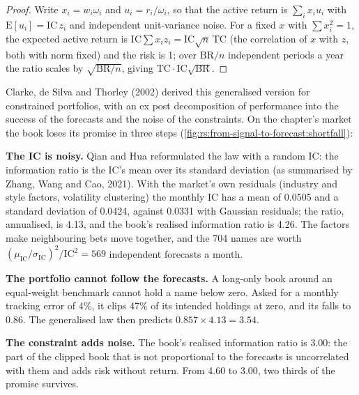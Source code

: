 \begin{proof}
Write $x_i = w_i\omega_i$ and $u_i = r_i/\omega_i$, so that the active return is $\sum_i x_iu_i$ with $\mathrm{E}[u_i] = \mathrm{IC}\,z_i$ and independent
unit-variance noise. For a fixed $x$ with $\sum x_i^2 = 1$, the expected active return is $\mathrm{IC}\sum x_iz_i = \mathrm{IC}\sqrt n\,\mathrm{TC}$ (the
correlation of $x$ with $z$, both with norm fixed) and the risk is 1; over $\mathrm{BR}/n$ independent periods a year the ratio scales by
$\sqrt{\mathrm{BR}/n}$, giving $\mathrm{TC}\cdot\mathrm{IC}\sqrt{\mathrm{BR}}$.
\end{proof}

Clarke, de Silva and Thorley (2002) derived this generalised version for constrained portfolios, with an ex post decomposition of performance into
the success of the forecasts and the noise of the constraints. On the chapter's market the book loses its promise in three steps
(\cref{fig:rs:from-signal-to-forecast:shortfall}):

\textbf{The IC is noisy.} Qian and Hua reformulated the law with a random IC: the information ratio is the IC's mean over its standard
deviation (as summarised by Zhang, Wang and Cao, 2021). With the market's own residuals (industry and style factors, volatility clustering) the
monthly IC has a mean of 0.0505 and a standard deviation of 0.0424, against 0.0331 with Gaussian residuals; the ratio, annualised, is 4.13, and the
book's realised information ratio is 4.26. The factors make neighbouring bets move together, and the 704 names are worth
$(\mu_{\mathrm{IC}}/\sigma_{\mathrm{IC}})^2/\mathrm{IC}^2 = 569$ independent forecasts a month.

\textbf{The portfolio cannot follow the forecasts.} A long-only book around an equal-weight benchmark cannot hold a name below zero. Asked for a
monthly tracking error of 4\%, it clips 47\% of its intended holdings at zero, and its  falls to 0.86. The generalised law then
predicts $0.857 \times 4.13 = 3.54$.

\textbf{The constraint adds noise.} The book's realised information ratio is 3.00: the part of the clipped book that is not proportional to the
forecasts is uncorrelated with them and adds risk without return. From 4.60 to 3.00, two thirds of the promise survives.

